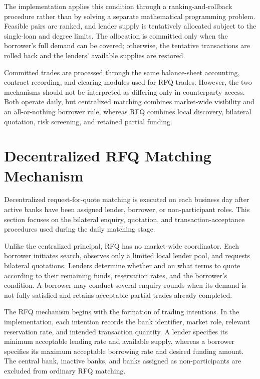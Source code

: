 The implementation applies this condition through a ranking-and-rollback
procedure rather than by solving a separate mathematical programming
problem. Feasible pairs are ranked, and lender supply is tentatively
allocated subject to the single-loan and degree limits. The allocation
is committed only when the borrower's full demand can be covered;
otherwise, the tentative transactions are rolled back and the lenders'
available supplies are restored.

Committed trades are processed through the same balance-sheet accounting,
contract recording, and clearing modules used for RFQ trades. However,
the two mechanisms should not be interpreted as differing only in
counterparty access. Both operate daily, but centralized matching combines
market-wide visibility and an all-or-nothing borrower rule, whereas RFQ
combines local discovery, bilateral quotation, risk screening, and retained
partial funding.

\section{Decentralized RFQ Matching Mechanism}

Decentralized request-for-quote matching is executed on each business
day after active banks have been assigned lender, borrower, or
non-participant roles. This section focuses on the
bilateral enquiry, quotation, and transaction-acceptance procedures used
during the daily matching stage.

Unlike the centralized principal, RFQ has no market-wide coordinator.
Each borrower initiates search, observes only a limited local lender pool,
and requests bilateral quotations. Lenders determine whether and on what
terms to quote according to their remaining funds, reservation rates, and
the borrower's condition. A borrower may conduct several enquiry rounds
when its demand is not fully satisfied and retains acceptable partial
trades already completed.

The RFQ mechanism begins with the formation of trading intentions. In
the implementation, each intention records the bank identifier, market
role, relevant reservation rate, and intended transaction quantity. A
lender specifies its minimum acceptable lending rate and available
supply, whereas a borrower specifies its maximum acceptable borrowing
rate and desired funding amount. The central bank, inactive banks, and
banks assigned as non-participants are excluded from ordinary RFQ
matching.

